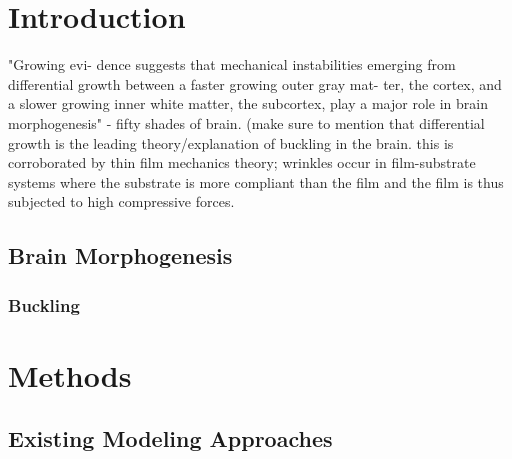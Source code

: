 \documentclass{article}
\begin{document}

\section{Introduction}
"Growing evi-
dence suggests that mechanical instabilities emerging from
differential growth between a faster growing outer gray mat-
ter, the cortex, and a slower growing inner white matter, the
subcortex, play a major role in brain morphogenesis" - fifty shades of brain. (make sure to mention that differential growth is the leading theory/explanation of buckling in the brain. this is corroborated by thin film mechanics theory; wrinkles occur in film-substrate systems where the substrate is more compliant than the film and the film is thus subjected to high compressive forces.

\subsection{Brain Morphogenesis}

\subsubsection{Buckling}

\section{Methods}
\subsection{Existing Modeling Approaches}

\end{document}

